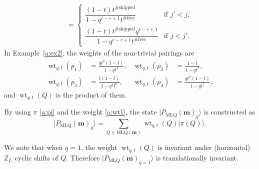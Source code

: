 \documentclass[11pt]{article}
\theoremstyle{definition}
\numberwithin{equation}{section}
\newcommand{\Z}{{\mathbb Z}}
\newcommand{\ket}[1]{\lvert #1 \rangle}
\newcommand{\mm}{\mathbf{m}}
\DeclareMathOperator{\wt}{wt}
\begin{document}
\begin{description}
\begin{align}
=
 \begin{cases}
\dfrac{(1-t)t^{\#\text{skipped}}}{1-q^{c-r+1}t^{\#\text{free}}}
& \text{if $j'<j$}, \\[.7em]
\dfrac{(1-t)t^{\#\text{skipped}}q^{c-r+1}}{1-q^{c-r+1}t^{\#\text{free}}}
& \text{if $j<j'$}.
\end{cases}
\label{a:wt2}
\end{align}
%
In Example~\ref{a:ex2}, the weights of the non-trivial pairings are
\begin{equation}
\begin{aligned}
\wt_{q,t}(p_1) & = \frac{qt^2(1-t)}{1-qt^4},
&
\wt_{q,t}(p_2) & = \frac{1-t}{1-qt^3},
\\
\wt_{q,t}(p_3) &= \frac{t(1-t)}{1-q^2t^6},
&
\wt_{q,t}(p_4) &= \frac{qt^2(1-t)}{1-qt^5},
\end{aligned}
\end{equation}
and $\wt_{q,t}(Q)$ is the product of them. 

\item[Step 3] By using $\pi$ \eqref{a:pi} and the weight  \eqref{a:wt1}, 
the state $\ket{P_{\text{MLQ}}(\mm)_q}$ is constructed as 
\begin{equation}\label{Smlq}
\ket{P_{\text{MLQ}}(\mm)_q}
= \sum_{Q \in \text{MLQ}(\mm)}
\wt_{q,t}(Q)\ket{\pi(Q)}.
\end{equation}
\end{description}

We note that when $q=1$, the weight $\wt_{q,t}(Q)$ is invariant under (horizontal) $\Z_L$ cyclic shifts of $Q$.
Therefore $\ket{P_{\text{MLQ}}(\mm)_{q=1}}$ is translationally invariant. 
\end{document}

